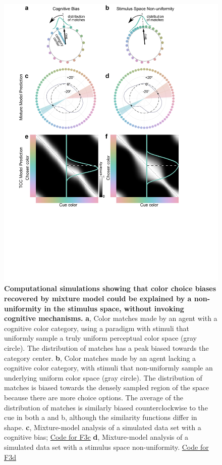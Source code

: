 \begin{figure}
    \begin{fullwidth}
    \centering
    \includegraphics[width=\textwidth,trim={0 7cm 0 0},clip]{../Figures/flat/F3_TCCModel_6.jpg}
    \caption{\textbf{Computational simulations showing that color choice biases recovered by mixture model \citep{zhang_discrete_2008, bae_why_2015} could be explained by a non-uniformity in the stimulus space, without invoking cognitive mechanisms.} \textbf{a}, Color matches made by an agent with a cognitive color category, using a paradigm with stimuli that uniformly sample a truly uniform perceptual color space (gray circle). The distribution of matches has a peak biased towards the category center. \textbf{b}, Color matches made by an agent lacking a cognitive color category, with stimuli that non-uniformly sample an underlying uniform color space (gray circle). The distribution of matches is biased towards the densely sampled region of the space because there are more choice options. The average of the distribution of matches is similarly biased counterclockwise to the cue in both a and b, although the similarity functions differ in shape. \textbf{c}, Mixture-model analysis of a simulated data set with a cognitive bias; \href{https://github.com/NEI-LSR/MacaqueColorCategories/blob/main/Outputs/Paper/Figures/working/F3_TCCModel/Code/F3ace_TCCModel_OffsetGaussian.m}{Code for F3c} \textbf{d}, Mixture-model analysis of a simulated data set with a stimulus space non-uniformity. \href{https://github.com/NEI-LSR/MacaqueColorCategories/blob/main/Outputs/Paper/Figures/working/F3_TCCModel/Code/F3bdf_TCCModel_StimulusSpaceNonUnifomity.m}{Code for F3d}
}
\end{fullwidth}
\end{figure}
